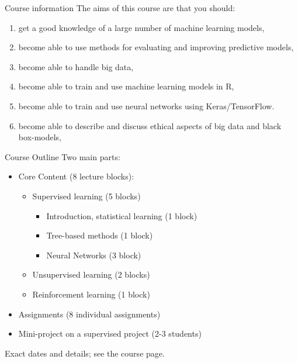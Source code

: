\documentclass[10pt]{beamer}
\begin{document}
\begin{frame}{Course information}
The aims of this course are that you should:\\[3mm]\pause
\begin{enumerate}
\item get a good knowledge of a large number of machine learning models,
\item become able to use methods for evaluating and improving predictive models,
\item become able to handle big data,
\item become able to train and use machine learning models in R,
\item become able to train and use neural networks using Keras/TensorFlow.
\item become able to describe and discuss ethical aspects of big data and black box-models,
\end{enumerate}

\end{frame}


\begin{frame}{Course Outline}
Two main parts:
\begin{itemize}
\item Core Content (8 lecture blocks):
\begin{itemize}
\item Supervised learning (5 blocks)
\begin{itemize}
\item Introduction, statistical learning (1 block)
\item Tree-based methods (1 block)
\item Neural Networks (3 block)
\end{itemize}
\item Unsupervised learning (2 blocks)
\item Reinforcement learning (1 block)\pause
\end{itemize}
\item Assignments (8 individual assignments)\pause
\item Mini-project on a supervised project (2-3 students)\pause
\end{itemize}
Exact dates and details; see the course page.
\end{frame}
\end{document}

